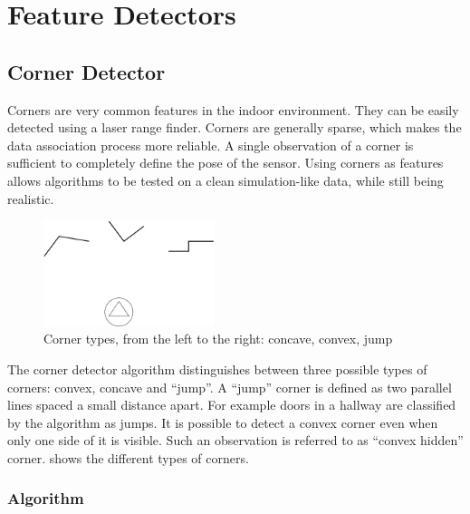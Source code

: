 

\section{Feature Detectors}

\subsection{Corner Detector}

Corners are very common features in the indoor environment. They can be
easily detected using a laser range finder. Corners are generally
sparse, which makes the data association process more reliable. A single
observation of a corner is sufficient to completely define the pose of
the sensor. Using corners as features allows algorithms to be tested on
a clean simulation-like data, while still being realistic.


\begin{figure}[htbp]
  \centering
  \includegraphics[width=5cm]{Pics/fig_corner_types}
  \caption[Types of corner features]{Corner types, from the left to the right: concave, convex,
  jump}
  \label{fig:corner_types}
\end{figure}

The corner detector algorithm distinguishes between three possible types
of corners: convex, concave and ``jump''. A ``jump'' corner is defined
as two parallel lines spaced a small distance apart. For example doors
in a hallway are classified by the algorithm as jumps.  It is possible
to detect a convex corner even when only one side of it is visible. Such
an observation is referred to as ``convex hidden''
corner.  shows the different types of
corners.


\subsubsection{Algorithm}

